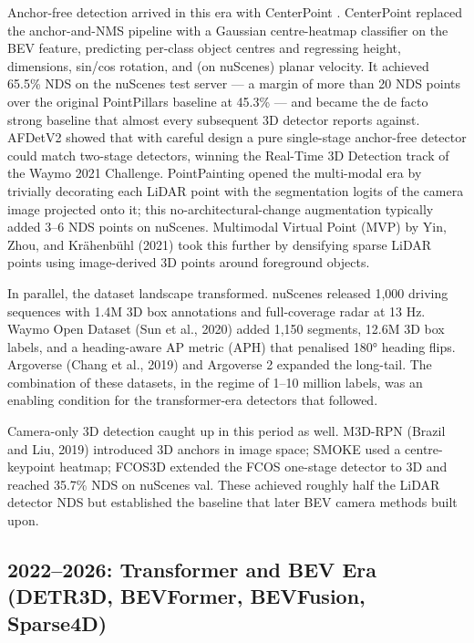 \documentclass{article}
\begin{document}
Anchor-free detection arrived in this era with CenterPoint \citep{yin2021multimodalvirtualp}. CenterPoint replaced the anchor-and-NMS pipeline with a Gaussian centre-heatmap classifier on the BEV feature, predicting per-class object centres and regressing height, dimensions, sin/cos rotation, and (on nuScenes) planar velocity. It achieved 65.5\% NDS on the nuScenes test server --- a margin of more than 20 NDS points over the original PointPillars baseline at 45.3\% --- and became the de facto strong baseline that almost every subsequent 3D detector reports against. AFDetV2 \citep{hu2022afdetv2rethinkingt} showed that with careful design a pure single-stage anchor-free detector could match two-stage detectors, winning the Real-Time 3D Detection track of the Waymo 2021 Challenge. PointPainting \citep{vora2020pointpaintingseque} opened the multi-modal era by trivially decorating each LiDAR point with the segmentation logits of the camera image projected onto it; this no-architectural-change augmentation typically added 3--6 NDS points on nuScenes. Multimodal Virtual Point (MVP) by Yin, Zhou, and Krähenbühl (2021) took this further by densifying sparse LiDAR points using image-derived 3D points around foreground objects.

In parallel, the dataset landscape transformed. nuScenes \citep{caesar2020nuscenesamultimoda} released 1,000 driving sequences with 1.4M 3D box annotations and full-coverage radar at 13 Hz. Waymo Open Dataset (Sun et al., 2020) added 1,150 segments, 12.6M 3D box labels, and a heading-aware AP metric (APH) that penalised 180° heading flips. Argoverse (Chang et al., 2019) and Argoverse 2 expanded the long-tail. The combination of these datasets, in the regime of 1--10 million labels, was an enabling condition for the transformer-era detectors that followed.

Camera-only 3D detection caught up in this period as well. M3D-RPN (Brazil and Liu, 2019) introduced 3D anchors in image space; SMOKE \citep{liu2020tanetrobust3dobjec} used a centre-keypoint heatmap; FCOS3D \citep{wang2021fcos3dfullyconvolu} extended the FCOS one-stage detector to 3D and reached 35.7\% NDS on nuScenes val. These achieved roughly half the LiDAR detector NDS but established the baseline that later BEV camera methods built upon.

\subsection{2022--2026: Transformer and BEV Era (DETR3D, BEVFormer, BEVFusion, Sparse4D)}\label{transformer-and-bev-era-detr3d-bevformer-bevfusion-sparse4d}
\end{document}
